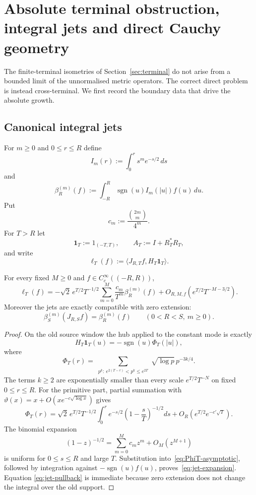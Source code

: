 
\section{Absolute terminal obstruction, integral jets and direct Cauchy geometry}\label{sec:direct-terminal}

The finite-terminal isometries of Section~\ref{sec:terminal} do not arise from a
bounded limit of the unnormalised metric operators.  The correct direct problem is
instead cross-terminal.  We first record the boundary data that drive the absolute
growth.

\subsection{Canonical integral jets}

For $m\ge0$ and $0\le r\le R$ define
\[
 \boxed{I_m(r):=\int_0^r s^m e^{-s/2}\,ds}
\tag{DT.1}\label{eq:jet-Im}
\]
and
\[
 \boxed{
 \beta_R^{(m)}(f)
 :=\int_{-R}^{R}\operatorname{sgn}(u)I_m(|u|)f(u)\,du.
 }
\tag{DT.2}\label{eq:jet-beta}
\]
Put
\[
 c_m:=\frac{\binom{2m}{m}}{4^m}.
\tag{DT.3}\label{eq:jet-cm}
\]
For $T>R$ let
\[
 \mathbf1_T:=1_{(-T,T)},
 \qquad
 A_T:=I+R_T^*R_T,
\]
and write
\[
 \ell_T(f):=\langle J_{R,T}f,H_T\mathbf1_T\rangle.
\tag{DT.4}\label{eq:terminal-ell}
\]

\begin{theorem}\label{thm:jet-expansion}
For every fixed $M\ge0$ and $f\in C_c^\infty((-R,R))$,
\[
 \boxed{
 \ell_T(f)
 =-\sqrt2\,e^{T/2}T^{-1/2}
 \sum_{m=0}^{M}\frac{c_m}{T^m}\beta_R^{(m)}(f)
 +O_{R,M,f}(e^{T/2}T^{-M-3/2}).
 }
\tag{DT.5}\label{eq:jet-expansion}
\]
Moreover the jets are exactly compatible with zero extension:
\[
 \boxed{
 \beta_S^{(m)}(J_{R,S}f)=\beta_R^{(m)}(f)
 \qquad(0<R<S,\ m\ge0).
 }
\tag{DT.6}\label{eq:jet-pullback}
\]
\end{theorem}

\begin{proof}
On the old source window the hub applied to the constant mode is exactly
\[
 H_T\mathbf1_T(u)
 =-\operatorname{sgn}(u)\Phi_T(|u|),
\]
where
\[
 \Phi_T(r)
 =\sum_{\substack{p^k:\ e^{2(T-r)}<p^k\le e^{2T}}}
 \sqrt{\log p}\,p^{-3k/4}.
\tag{DT.7}\label{eq:PhiT-def}
\]
The terms $k\ge2$ are exponentially smaller than every scale
$e^{T/2}T^{-N}$ on fixed $0\le r\le R$.  For the primitive part, partial summation with
$\vartheta(x)=x+O(xe^{-c\sqrt{\log x}})$ gives
\[
 \Phi_T(r)
 =\sqrt2\,e^{T/2}T^{-1/2}
 \int_0^r e^{-s/2}\left(1-\frac{s}{T}\right)^{-1/2}ds
 +O_R(e^{T/2}e^{-c'\sqrt T}).
\tag{DT.8}\label{eq:PhiT-asymptotic}
\]
The binomial expansion
\[
 (1-z)^{-1/2}=\sum_{m=0}^{M}c_mz^m+O_M(z^{M+1})
\]
is uniform for $0\le s\le R$ and large $T$.  Substitution into~\eqref{eq:PhiT-asymptotic}, followed
by integration against $-\operatorname{sgn}(u)f(u)$, proves~\eqref{eq:jet-expansion}.  Equation
\eqref{eq:jet-pullback} is immediate because zero extension does not change the integral over the
old support.
\end{proof}

